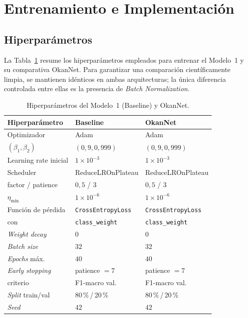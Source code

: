 \section{Entrenamiento e Implementación}

\subsection{Hiperparámetros}
\label{sec:hiperparam}

La Tabla~\ref{tab:hiperparam} resume los hiperparámetros
empleados para entrenar el Modelo~1 y su comparativa OkanNet.
Para garantizar una comparación científicamente limpia, se
mantienen idénticos en ambas arquitecturas; la única diferencia
controlada entre ellas es la presencia de
\textit{Batch Normalization}.

\begin{table}[!t]
\centering
\caption{Hiperparámetros del Modelo~1 (Baseline) y OkanNet.}
\label{tab:hiperparam}
\renewcommand{\arraystretch}{1.15}
\footnotesize
\begin{tabular}{@{}lll@{}}
\toprule
\textbf{Hiperparámetro} & \textbf{Baseline} & \textbf{OkanNet} \\
\midrule
Optimizador               & Adam                      & Adam                      \\
\quad $(\beta_1, \beta_2)$ & $(0{,}9, 0{,}999)$        & $(0{,}9, 0{,}999)$        \\
Learning rate inicial     & $1\times 10^{-3}$         & $1\times 10^{-3}$         \\
Scheduler                 & ReduceLROnPlateau         & ReduceLROnPlateau         \\
\quad factor / patience   & $0{,}5$ / $3$             & $0{,}5$ / $3$             \\
\quad $\eta_{\min}$       & $1\times 10^{-6}$         & $1\times 10^{-6}$         \\
Función de pérdida        & \texttt{CrossEntropyLoss} & \texttt{CrossEntropyLoss} \\
\quad con                 & \texttt{class\_weight}    & \texttt{class\_weight}    \\
\textit{Weight decay}     & $0$                       & $0$                       \\
\textit{Batch size}       & $32$                      & $32$                      \\
\textit{Epochs} máx.      & $40$                      & $40$                      \\
\textit{Early stopping}   & patience $=7$             & patience $=7$             \\
\quad criterio            & F1-macro val.             & F1-macro val.             \\
\textit{Split} train/val  & 80\,\%\,/\,20\,\%          & 80\,\%\,/\,20\,\%          \\
\textit{Seed}             & $42$                      & $42$                      \\
\bottomrule
\end{tabular}
\end{table}

